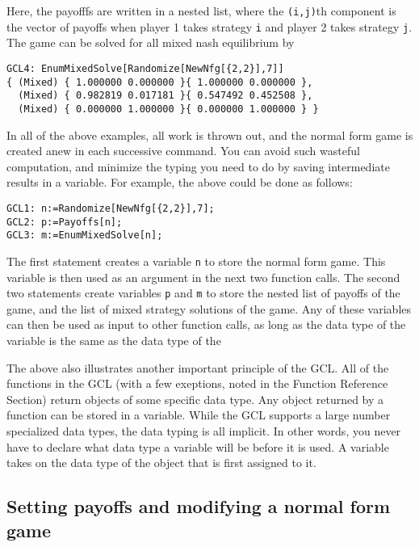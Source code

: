 \noindent
Here, the payofffs are written in a nested list, where the
\verb+(i,j)+th component is the vector of payoffs when player 1 takes
strategy \verb+i+ and player 2 takes strategy \verb+j+.  The game can
be solved for all mixed nash equilibrium by

\begin{verbatim}
GCL4: EnumMixedSolve[Randomize[NewNfg[{2,2}],7]]
{ (Mixed) { 1.000000 0.000000 }{ 1.000000 0.000000 },
  (Mixed) { 0.982819 0.017181 }{ 0.547492 0.452508 },
  (Mixed) { 0.000000 1.000000 }{ 0.000000 1.000000 } }
\end{verbatim}

In all of the above examples, all work is thrown out, and the normal
form game is created anew in each successive command.  You can avoid
such wasteful computation, and minimize the typing you need to do by
saving intermediate results in a variable.  For example, the above
could be done as follows:

\begin{verbatim}
GCL1: n:=Randomize[NewNfg[{2,2}],7];
GCL2: p:=Payoffs[n];
GCL3: m:=EnumMixedSolve[n];
\end{verbatim}

The first statement creates a variable \verb+n+ to store the normal
form game.  This variable is then used as an argument in the next two
function calls.  The second two statements create variables \verb+p+
and \verb+m+ to store the nested list of payoffs of the game, and the
list of mixed strategy solutions of the game.  Any of these variables
can then be used as input to other function calls, as long as the data
type of the variable is the same as the data type of the 

The above also illustrates another important principle of the GCL.
All of the functions in the GCL (with a few exeptions, noted in the
Function Reference Section) return objects of some specific data type.
Any object returned by a function can be stored in a variable.  While
the GCL supports a large number specialized data types, the data
typing is all implicit.  In other words, you never have to declare
what data type a variable will be before it is used.  A variable takes
on the data type of the object that is first assigned to it.    

\subsection{Setting payoffs and modifying a normal form game}  

